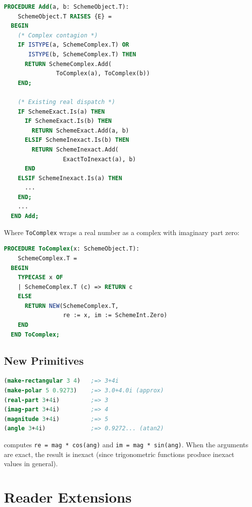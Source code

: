 \documentclass[12pt]{article}
\begin{document}
\begin{lstlisting}[language=Modula3]
PROCEDURE Add(a, b: SchemeObject.T):
    SchemeObject.T RAISES {E} =
  BEGIN
    (* Complex contagion *)
    IF ISTYPE(a, SchemeComplex.T) OR
       ISTYPE(b, SchemeComplex.T) THEN
      RETURN SchemeComplex.Add(
               ToComplex(a), ToComplex(b))
    END;

    (* Existing real dispatch *)
    IF SchemeExact.Is(a) THEN
      IF SchemeExact.Is(b) THEN
        RETURN SchemeExact.Add(a, b)
      ELSIF SchemeInexact.Is(b) THEN
        RETURN SchemeInexact.Add(
                 ExactToInexact(a), b)
      END
    ELSIF SchemeInexact.Is(a) THEN
      ...
    END;
    ...
  END Add;
\end{lstlisting}

\noindent Where {\tt ToComplex} wraps a real number as a complex
with imaginary part zero:
\begin{lstlisting}[language=Modula3]
PROCEDURE ToComplex(x: SchemeObject.T):
    SchemeComplex.T =
  BEGIN
    TYPECASE x OF
    | SchemeComplex.T (c) => RETURN c
    ELSE
      RETURN NEW(SchemeComplex.T,
                 re := x, im := SchemeInt.Zero)
    END
  END ToComplex;
\end{lstlisting}

\subsection{New Primitives}

\begin{lstlisting}[language=Scheme]
(make-rectangular 3 4)   ;=> 3+4i
(make-polar 5 0.9273)    ;=> 3.0+4.0i (approx)
(real-part 3+4i)         ;=> 3
(imag-part 3+4i)         ;=> 4
(magnitude 3+4i)         ;=> 5
(angle 3+4i)             ;=> 0.9272... (atan2)
\end{lstlisting}

 computes {\tt re = mag * cos(ang)} and
{\tt im = mag * sin(ang)}.  When the arguments are exact, the
result is inexact (since trigonometric functions produce inexact
values in general).

\section{Reader Extensions}
\label{sec:reader}
\end{document}
